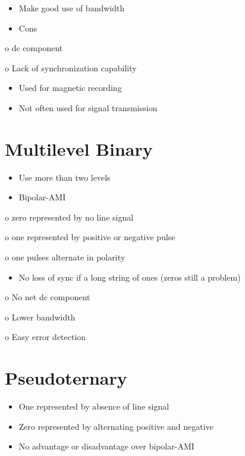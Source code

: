 \documentclass[10pt]{article}
\begin{document}
\begin{itemize}
  \item Make good use of bandwidth

  \item Cons

\end{itemize}

o dc component

o Lack of synchronization capability

\begin{itemize}
  \item Used for magnetic recording

  \item Not often used for signal transmission

\end{itemize}

\section{Multilevel Binary}
\begin{itemize}
  \item Use more than two levels

  \item Bipolar-AMI

\end{itemize}

o zero represented by no line signal

o one represented by positive or negative pulse

o one pulses alternate in polarity

\begin{itemize}
  \item No loss of sync if a long string of ones (zeros still a problem)
\end{itemize}

o No net dc component

o Lower bandwidth

o Easy error detection

\section{Pseudoternary}
\begin{itemize}
  \item One represented by absence of line signal

  \item Zero represented by alternating positive and negative

  \item No advantage or disadvantage over bipolar-AMI

\end{itemize}
\end{document}
